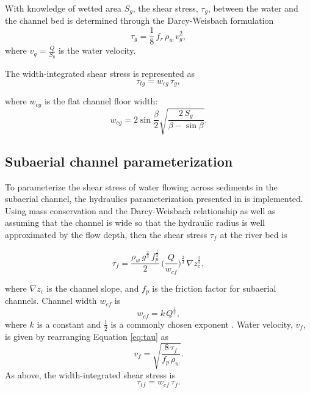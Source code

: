 \documentclass[draft]{agujournal2019}
\newcommand{\mauro}[1]{{\textbf{\color{green}Mauro says:} \color{green} #1} }
\begin{document}
With knowledge of wetted area $S_g$, the shear stress, $\tau_g$, between the water and the channel bed is determined through the Darcy-Weisbach formulation
\begin{equation}
  \label{eq:tau}
  \tau_g=\frac{1}{8}\,f_r\,\rho_w\,v_g^2,
\end{equation}
%
where $v_g = \frac{Q}{S_g}$ is the water velocity.

The width-integrated shear stress is represented as
\begin{equation}
  \label{eq:tautg}
  \tau_{tg}=w_{cg}\,\tau_g,
\end{equation}

where $w_{cg}$ is the flat channel floor width:
\begin{equation}
  \label{eq:dh2wc}
  w_{cg} = 2  \sin \frac{\beta}{2} \sqrt{\frac{2\, S_g}{\beta -\sin \beta}}.
\end{equation}

\subsection{Subaerial channel  parameterization}
\label{sect:fluv}

To parameterize the shear stress of water flowing across sediments in the subaerial channel,  the hydraulics parameterization presented in  is implemented.
Using mass conservation and the Darcy-Weisbach relationship as well as assuming that the channel is wide so that the hydraulic radius is well approximated by the flow depth, then
the shear stress $\tau_f$ at the river bed is
\begin{linenomath*}
  \begin{equation}
    \label{eq:DW_tau}
    \tau_f=\frac{\rho_w\,g^{\frac{2}{3}}\,f_p^{\frac{1}{3}}}{2}\, \Big(\frac{Q}{w_{cf}} \Big)^{\frac{2}{3}} \,\nabla z_c^{\frac{2}{3}},
  \end{equation}
\end{linenomath*}
where $\nabla z_c$ is the channel slope, and $f_p$ is the friction factor for subaerial channels.
Channel width $w_{cf}$ is
\begin{equation}
  \label{eq:wcf}
  w_{cf} = k \, Q^\frac{1}{2},
\end{equation}
%
where $k$ is a constant and $\frac{1}{2}$ is a commonly chosen exponent \cite{leopold1953}.
Water velocity, $v_f$, is given by rearranging Equation \ref{eq:tau} as
\begin{equation}
  \label{eq:vf}
  v_f = \sqrt{\frac{8\,\tau_f}{f_p\,\rho_w}}.
\end{equation}
%
As above, the width-integrated shear stress is
\begin{equation}
    \label{eq:tautf}
    \tau_{tf}=w_{cf}\,\tau_f.
  \end{equation}
  
\end{document}

